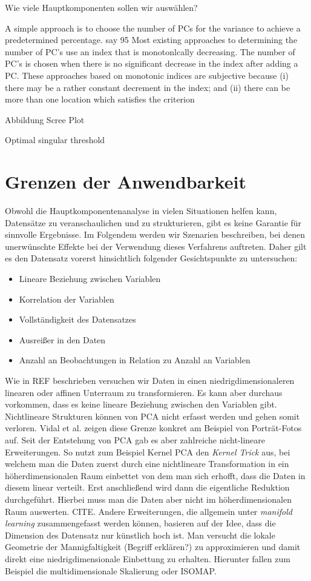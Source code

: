 Wie viele Hauptkomponenten sollen wir auswählen?

A simple approach is to choose the number of
PCs for the variance to achieve a predetermined
percentage. say 95%
Most existing approaches to determining the number of PC's use an index that is monotonlcally
decreasing. The number of PC's is chosen when
there is no significant decrease in the index after
adding a PC. These approaches based on monotonic indices are subjective because (i) there may
be a rather constant decrement in the index; and
(ii) there can be more than one location which
satisfies the criterion

Abbildung Scree Plot

Optimal singular threshold \cite{gavish}

\section{Grenzen der Anwendbarkeit} \label{theo_results}

Obwohl die Hauptkomponentenanalyse in vielen Situationen helfen kann, Datensätze zu veranschaulichen und zu strukturieren, gibt es keine Garantie für sinnvolle Ergebnisse. Im Folgendem werden wir Szenarien beschreiben, bei denen unerwünschte Effekte bei der Verwendung dieses Verfahrens auftreten. Daher gilt es den Datensatz vorerst hinsichtlich folgender Gesichtspunkte zu untersuchen: 

\begin{itemize}
\item Lineare Beziehung zwischen Variablen
\item Korrelation der Variablen
\item Vollständigkeit des Datensatzes
\item Ausreißer in den Daten
\item Anzahl an Beobachtungen in Relation zu Anzahl an Variablen
\end{itemize}

Wie in REF beschrieben versuchen wir Daten in einen niedrigdimensionaleren linearen oder affinen Unterraum zu transformieren. Es kann aber durchaus vorkommen, dass es keine lineare Beziehung zwischen den Variablen gibt. Nichtlineare Strukturen können von PCA nicht erfasst werden und gehen somit verloren. \cite{vidal} Vidal et al. zeigen diese Grenze konkret am Beispiel von Porträt-Fotos auf. Seit der Entstehung von PCA gab es aber zahlreiche nicht-lineare Erweiterungen. So nutzt zum Beispiel Kernel PCA den \textit{Kernel Trick} aus, bei welchem man die Daten zuerst durch eine nichtlineare Transformation in ein höherdimensionalen Raum einbettet von dem man sich erhofft, dass die Daten in diesem linear verteilt. Erst anschließend wird dann die eigentliche Reduktion durchgeführt. Hierbei muss man die Daten aber nicht im höherdimensionalen Raum auswerten. CITE. Andere Erweiterungen, die allgemein unter \textit{manifold learning} zusammengefasst werden können, basieren auf der Idee, dass die Dimension des Datensatz nur künstlich hoch ist. Man versucht die lokale Geometrie der Mannigfaltigkeit (Begriff erklären?) zu approximieren und damit direkt eine niedrigdimensionale Einbettung zu erhalten. Hierunter fallen zum Beispiel die multidimensionale Skalierung oder ISOMAP.

